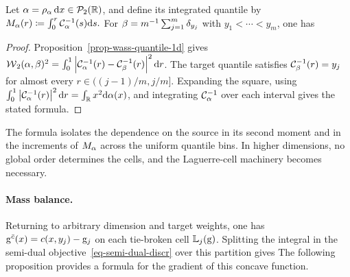 \begin{prop}\label{prop-semidiscrete-1d-quantile}
	Let \(\alpha=\rho_\alpha\,\mathrm{d} x\in\mathcal{P}_2(\mathbb{R})\), and define its integrated quantile by
	\(
		M_\alpha(r) \coloneqq \int_0^r \mathcal{C}_{\alpha}^{-1}(s)\mathrm{d} s.
	\)
	For
	\(
		\beta=m^{-1}\sum_{j=1}^m\delta_{y_j}
	\)
	with \(y_1<\cdots<y_m\), one has
\end{prop}
\begin{proof}
	Proposition~\ref{prop-wass-quantile-1d} gives \(\operatorname{\mathcal{W}}_2(\alpha,\beta)^2=\int_0^1\left\lvert\mathcal{C}_{\alpha}^{-1}(r)-\mathcal{C}_{\beta}^{-1}(r)\right\rvert^2\mathrm{d} r\). The target quantile satisfies \(\mathcal{C}_{\beta}^{-1}(r)=y_j\) for almost every \(r\in((j-1)/m,j/m]\). Expanding the square, using \(\int_0^1\left\lvert\mathcal{C}_{\alpha}^{-1}(r)\right\rvert^2\mathrm{d} r=\int_{\mathbb{R}} x^2\mathrm{d}\alpha(x)\), and integrating \(\mathcal{C}_{\alpha}^{-1}\) over each interval gives the stated formula.
\end{proof}

The formula isolates the dependence on the source in its second moment and in the increments of $M_\alpha$ across the uniform quantile bins. In higher dimensions, no global order determines the cells, and the Laguerre-cell machinery becomes necessary.

\paragraph{Mass balance.}

Returning to arbitrary dimension and target weights, one has \(\mathrm{g}^{\bar{c}}(x)=c(x,y_j)-\mathrm{g}_j\) on each tie-broken cell \(\mathbb{L}_j(\mathrm{g})\). Splitting the integral in the semi-dual objective~\eqref{eq-semi-dual-discr} over this partition gives
The following proposition provides a formula for the gradient of this concave function.


